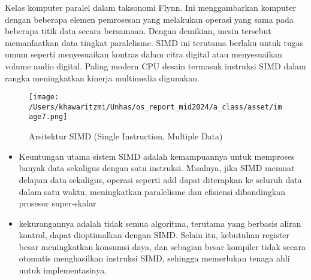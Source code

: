 \documentclass[12pt]{article}
\begin{document}
\begin{enumerate}
    Kelas komputer paralel dalam taksonomi Flynn. Ini menggambarkan komputer dengan beberapa elemen pemrosesan yang melakukan operasi yang sama pada beberapa titik data secara bersamaan. Dengan demikian, mesin tersebut memanfaatkan data tingkat paralelisme. SIMD ini terutama berlaku untuk tugas umum seperti menyesuaikan kontras dalam citra digital atau menyesuaikan volume audio digital. Paling modern CPU desain termasuk instruksi SIMD dalam rangka meningkatkan kinerja multimedia digunakan.
    \begin{figure}[h]
        \centering
        \texttt{[image: /Users/khawaritzmi/Unhas/os\_report\_mid2024/a\_class/asset/image7.png]}  %
        \caption{Arsitektur SIMD (Single Instruction, Multiple Data)}
        \label{fig:contoh_gambar}
    \end{figure}
    \begin{itemize}
        \item Keuntungan utama sistem SIMD adalah kemampuannya untuk memproses banyak data sekaligus dengan satu instruksi. Misalnya, jika SIMD memuat delapan data sekaligus, operasi seperti add dapat diterapkan ke seluruh data dalam satu waktu, meningkatkan paralelisme dan efisiensi dibandingkan prosesor super-skalar
        \item kekurangannya adalah tidak semua algoritma, terutama yang berbasis aliran kontrol, dapat dioptimalkan dengan SIMD. Selain itu, kebutuhan register besar meningkatkan konsumsi daya, dan sebagian besar kompiler tidak secara otomatis menghasilkan instruksi SIMD, sehingga memerlukan tenaga ahli untuk implementasinya.
    \end{itemize}


\end{enumerate}
\end{document}
